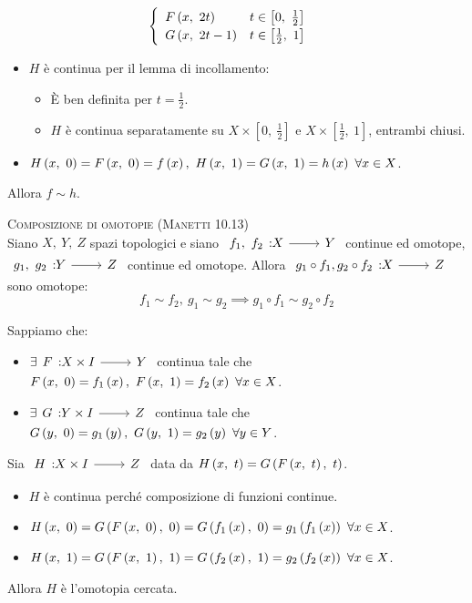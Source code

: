 \begin{demonstration}
\begin{itemize}
\begin{equation*}
\begin{cases}
		\begin{array}{lc}
			F\left(x,\ 2t\right) & t\in\left[0,\ \frac{1}{2}\right] \\
			G\left(x,\ 2t-1\right) & t\in\left[\frac{1}{2},\ 1\right]
		\end{array}	
	\end{cases}
\end{equation*}
\begin{itemize}
	\item $H$ è continua per il lemma di incollamento:
	\begin{itemize}
		\item È ben definita per $t=\frac{1}{2}$.
		\item $H$ è continua separatamente su $X\times \left[0,\ \frac{1}{2}\right]$ e $X\times \left[\frac{1}{2},\ 1\right]$, entrambi chiusi.
	\end{itemize}
\item $\mvf{H}{x}{0}=\mvf{F}{x}{0}=f\left(x\right),\ \mvf{H}{x}{1}=\mvf{G}{x}{1}=h\left(x\right)\ \forall x\in X$.
\end{itemize}
Allora $f\sim h$.
\end{itemize}
\end{demonstration}
\begin{lemming}\textsc{Composizione di omotopie (Manetti 10.13)}\label{compomotop}\\
	Siano $X,\ Y,\ Z$ spazi topologici e siano $\funz{f_1,\ f_2}{X}{Y}$ continue ed omotope, $\funz{g_1,\ g_2}{Y}{Z}$ continue ed omotope. Allora $\funz{g_1\circ f_1,  g_2\circ f_2}{X}{Z}$ sono omotope:
	\begin{equation}
		f_1\sim f_2,\ g_1\sim g_2\implies g_1\circ f_1\sim g_2\circ f_2
	\end{equation}
\vspace{-6mm}
\end{lemming}
\begin{demonstration}
	Sappiamo che:
	\begin{itemize}
		\item $\exists \funz{F}{X\times I}{Y}$ continua tale che $\mvf{F}{x}{0}=f_1\left(x\right),\ \mvf{F}{x}{1}=f_2\left(x\right)\ \forall x\in X$. 
		\item $\exists \funz{G}{Y\times I}{Z}$ continua tale che $\mvf{G}{y}{0}=g_1\left(y\right),\ \mvf{G}{y}{1}=g_2\left(y\right)\ \forall y\in Y$.
	\end{itemize}
Sia $\funz{H}{X\times I}{Z}$ data da $H\left(x,\ t\right)=G\left(F\left(x,\ t\right),\ t\right)$.
\begin{itemize}
	\item $H$ è continua perché composizione di funzioni continue.
	\item $\mvf{H}{x}{0}=\mvf{G}{\mvf{F}{x}{0}}{0}=\mvf{G}{f_1\left(x\right)}{0}=g_1\left(f_1\left(x\right)\right)\ \forall x\in X$.
	\item $\mvf{H}{x}{1}=\mvf{G}{\mvf{F}{x}{1}}{1}=\mvf{G}{f_2\left(x\right)}{1}=g_2\left(f_2\left(x\right)\right)\ \forall x\in X$.
\end{itemize}
Allora $H$ è l'omotopia cercata.
\end{demonstration}
